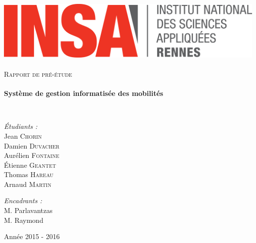 \begin{titlepage}
		\begin{sffamily}
			\begin{center}
				
				\includegraphics[width=400pt]{logo_INSA.png}~\\[2.5cm]
				
				\textsc{\huge Rapport de pré-étude}\\[2.5cm]
				
				\HRule \\[0.4cm]
				{ \huge \bfseries Système de gestion informatisée des mobilités\\[0.4cm] }
				
				\HRule \\[4cm]
				
				\begin{minipage}{0.4\textwidth}
					\begin{flushleft} \large
						\emph{Étudiants :}\\
						Jean \textsc{Chorin}\\
						Damien \textsc{Duvacher}\\
						Aurélien \textsc{Fontaine}\\
						Étienne \textsc{Geantet}\\
						Thomas \textsc{Hareau}\\
						Arnaud \textsc{Martin}\\
					\end{flushleft}
				\end{minipage}
				\begin{minipage}{0.5\textwidth}
					\begin{flushright} \large
						\emph{Encadrants :} \\
						M. Parlavantzas\\
						M. Raymond
					\end{flushright}
				\end{minipage}
				
				\vfill
				
				{\large Année 2015 - 2016}
				
			\end{center}
		\end{sffamily}
	\end{titlepage}